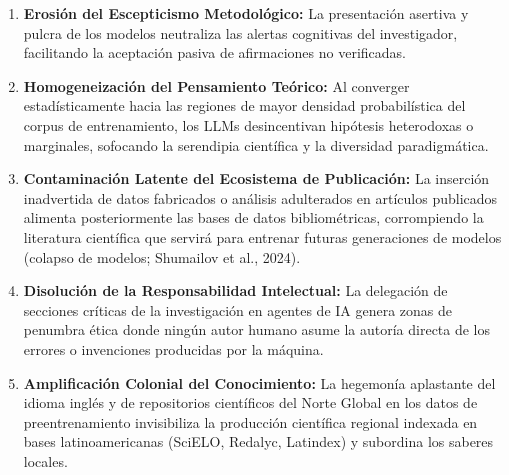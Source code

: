 \begin{enumerate}
    \item \textbf{Erosión del Escepticismo Metodológico:} La presentación asertiva y pulcra de los modelos neutraliza las alertas cognitivas del investigador, facilitando la aceptación pasiva de afirmaciones no verificadas.
    \item \textbf{Homogeneización del Pensamiento Teórico:} Al converger estadísticamente hacia las regiones de mayor densidad probabilística del corpus de entrenamiento, los LLMs desincentivan hipótesis heterodoxas o marginales, sofocando la serendipia científica y la diversidad paradigmática.
    \item \textbf{Contaminación Latente del Ecosistema de Publicación:} La inserción inadvertida de datos fabricados o análisis adulterados en artículos publicados alimenta posteriormente las bases de datos bibliométricas, corrompiendo la literatura científica que servirá para entrenar futuras generaciones de modelos (colapso de modelos; Shumailov et al., 2024).
    \item \textbf{Disolución de la Responsabilidad Intelectual:} La delegación de secciones críticas de la investigación en agentes de IA genera zonas de penumbra ética donde ningún autor humano asume la autoría directa de los errores o invenciones producidas por la máquina.
    \item \textbf{Amplificación Colonial del Conocimiento:} La hegemonía aplastante del idioma inglés y de repositorios científicos del Norte Global en los datos de preentrenamiento invisibiliza la producción científica regional indexada en bases latinoamericanas (SciELO, Redalyc, Latindex) y subordina los saberes locales.
\end{enumerate}

